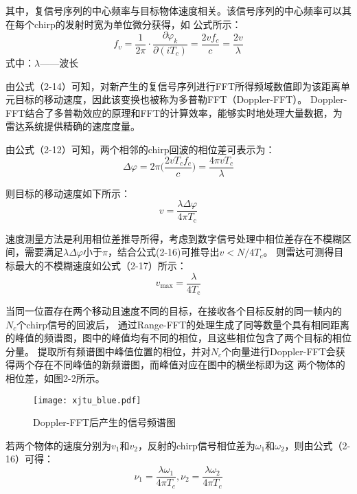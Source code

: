 其中，复信号序列的中心频率与目标物体速度相关。该信号序列的中心频率可以其在每个chirp的发射时宽为单位微分获得，如
公式所示：
\begin{equation}
    f_{v}=\frac{1}{2\pi}\cdot\frac{\partial\varphi_{k}}{\partial\left(iT_{c}\right)}=\frac{2v f_{c}}{c}=\frac{2v}{\lambda}
\end{equation}
式中：$\lambda$——波长

由公式（2-14）可知，对新产生的复信号序列进行FFT所得频域数值即为该距离单元目标的移动速度，因此该变换也被称为多普勒FFT（Doppler-FFT）。
Doppler-FFT结合了多普勒效应的原理和FFT的计算效率，能够实时地处理大量数据，为雷达系统提供精确的速度度量。

由公式（2-12）可知，两个相邻的chirp回波的相位差可表示为：
\begin{equation}
    \Delta\varphi=2\pi\Bigg(\frac{2v T_{c}f_{c}}{c}\Bigg)=\frac{4\pi v T_{c}}{\lambda}
\end{equation}

则目标的移动速度如下所示：
\begin{equation}
    v=\frac{\lambda\Delta\varphi}{4\pi T_{\mathrm{c}}}
\end{equation}

速度测量方法是利用相位差推导所得，考虑到数字信号处理中相位差存在不模糊区间，需要满足$\lambda\Delta\varphi$小于$\pi$，结合公式(2-16)可推导出$v<N/4T_{c}$。
则雷达可测得目标最大的不模糊速度如公式（2-17）所示：
\begin{equation}
    v_{\max}=\frac{\lambda}{4T_{\mathrm{c}}}
\end{equation}

当同一位置存在两个移动且速度不同的目标，在接收各个目标反射的同一帧内的$N_{c}$个chirp信号的回波后，
通过Range-FFT的处理生成了同等数量个具有相同距离的峰值的频谱图，图中的峰值均有不同的相位，且这些相位包含了两个目标的相位分量。
提取所有频谱图中峰值位置的相位，并对$N_{c}$个向量进行Doppler-FFT会获得两个存在不同峰值的新频谱图，而峰值对应在图中的横坐标即为这
两个物体的相位差，如图2-2所示。
\begin{figure}[H]
    \centering
    \texttt{[image: xjtu\_blue.pdf]}
    \caption{Doppler-FFT后产生的信号频谱图}
\end{figure}

若两个物体的速度分别为$v_{1}$和$v_{2}$，反射的chirp信号相位差为$\omega_{1}$和$\omega_{2}$，则由公式（2-16）可得：
\begin{equation}
    \nu_1=\frac{\lambda\omega_1}{4\pi T_c},\nu_2=\frac{\lambda\omega_2}{4\pi T_c}
\end{equation}


